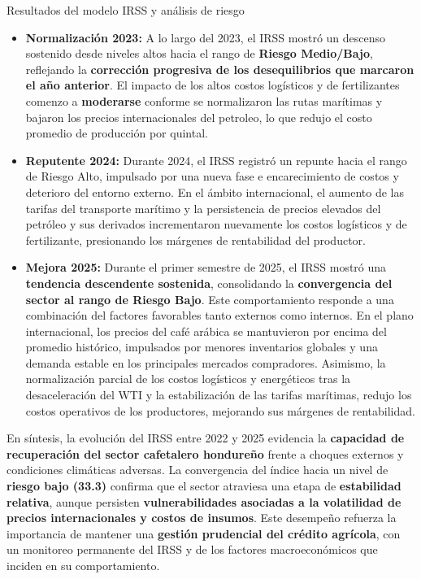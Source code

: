 \documentclass[final]{beamer}
\newlength{\colwidth}
\begin{document}
\begin{frame}[t]
\begin{columns}[t]
\begin{column}{\colwidth}
\begin{block}{Resultados del modelo IRSS y análisis de riesgo}
\begin{itemize}
   \item \textbf{Normalización 2023:} A lo largo del 2023, el IRSS mostró un descenso sostenido desde niveles altos hacia el rango de \textbf{Riesgo Medio/Bajo}, reflejando la \textbf{corrección progresiva de los desequilibrios que marcaron el año anterior}. El impacto de los altos costos logísticos y de fertilizantes comenzo a \textbf{moderarse} conforme se normalizaron las rutas marítimas y bajaron los precios internacionales del petroleo, lo que redujo el costo promedio de producción por quintal. 
   \item \textbf{Reputente 2024:} Durante 2024, el IRSS registró un repunte hacia el rango de Riesgo Alto, impulsado por una nueva fase e encarecimiento de costos y deterioro del entorno externo. En el ámbito internacional, el aumento de las tarifas del transporte marítimo y la persistencia de precios elevados del petróleo y sus derivados incrementaron nuevamente los costos logísticos y de fertilizante, presionando los márgenes de rentabilidad del productor. 
   \item \textbf{Mejora 2025:} Durante el primer semestre de 2025, el IRSS mostró una \textbf{tendencia descendente sostenida}, consolidando la \textbf{convergencia del sector al rango de Riesgo Bajo}. Este comportamiento responde a una combinación del factores favorables tanto externos como internos. En el plano internacional, los precios del café arábica se mantuvieron por encima del promedio histórico, impulsados por menores inventarios globales y una demanda estable en los principales mercados compradores. Asimismo, la normalización parcial de los costos logísticos y energéticos tras la desaceleración del WTI y la estabilización de las tarifas marítimas, redujo los costos operativos de los productores, mejorando sus márgenes de rentabilidad. 
   \end{itemize}
En síntesis, la evolución del IRSS entre 2022 y 2025 evidencia la \textbf{capacidad de recuperación del sector cafetalero hondureño} frente a choques externos y condiciones climáticas adversas. La convergencia del índice hacia un nivel de \textbf{riesgo bajo (33.3)} confirma que el sector atraviesa una etapa de \textbf{estabilidad relativa}, aunque persisten \textbf{vulnerabilidades asociadas a la volatilidad de precios internacionales y costos de insumos}. Este desempeño refuerza la importancia de mantener una \textbf{gestión prudencial del crédito agrícola}, con un monitoreo permanente del IRSS y de los factores macroeconómicos que inciden en su comportamiento. 
  \end{block}


\end{column}
\end{columns}
\end{frame}
\end{document}
